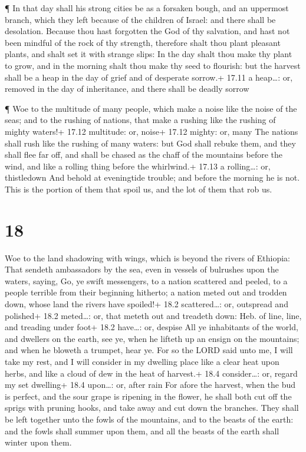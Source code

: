  ¶ In that day shall his strong cities be as a forsaken
bough, and an uppermost branch, which they left because of the children
of Israel: and there shall be desolation.  Because thou
hast forgotten the God of thy salvation, and hast not been mindful of
the rock of thy strength, therefore shalt thou plant pleasant plants,
and shalt set it with strange slips:  In the day shalt thou
make thy plant to grow, and in the morning shalt thou make thy seed to
flourish: but the harvest shall be a heap in the day of grief and of
desperate sorrow.+ 17.11 a heap\ldots: or, removed in the day of
inheritance, and there shall be deadly sorrow

 ¶ Woe to the multitude of many people, which make a noise
like the noise of the seas; and to the rushing of nations, that make a
rushing like the rushing of mighty waters!+ 17.12 multitude: or, noise+
17.12 mighty: or, many  The nations shall rush like the
rushing of many waters: but God shall rebuke them, and they shall flee
far off, and shall be chased as the chaff of the mountains before the
wind, and like a rolling thing before the whirlwind.+ 17.13 a
rolling\ldots: or, thistledown  And behold at eveningtide
trouble; and before the morning he is not. This is the portion of them
that spoil us, and the lot of them that rob us.

\hypertarget{section-17}{%
\section{18}\label{section-17}}

 Woe to the land shadowing with wings, which is beyond the
rivers of Ethiopia:  That sendeth ambassadors by the sea,
even in vessels of bulrushes upon the waters, saying, Go, ye swift
messengers, to a nation scattered and peeled, to a people terrible from
their beginning hitherto; a nation meted out and trodden down, whose
land the rivers have spoiled!+ 18.2 scattered\ldots: or, outspread and
polished+ 18.2 meted\ldots: or, that meteth out and treadeth down: Heb.
of line, line, and treading under foot+ 18.2 have\ldots: or, despise
 All ye inhabitants of the world, and dwellers on the earth,
see ye, when he lifteth up an ensign on the mountains; and when he
bloweth a trumpet, hear ye.  For so the LORD said unto me, I
will take my rest, and I will consider in my dwelling place like a clear
heat upon herbs, and like a cloud of dew in the heat of harvest.+ 18.4
consider\ldots: or, regard my set dwelling+ 18.4 upon\ldots: or, after
rain  For afore the harvest, when the bud is perfect, and
the sour grape is ripening in the flower, he shall both cut off the
sprigs with pruning hooks, and take away and cut down the branches.
 They shall be left together unto the fowls of the
mountains, and to the beasts of the earth: and the fowls shall summer
upon them, and all the beasts of the earth shall winter upon them.

